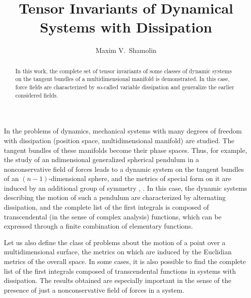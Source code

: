 \documentclass[12pt]{llncs}
\begin{document}
%

\fi
\title{Tensor Invariants of Dynamical Systems with Dissipation}
\author{Maxim V.~Shamolin 
}

\maketitle

\begin{abstract}
In this work, the complete set of tensor invariants of some classes of dynamic systems on the tangent bundles of a multidimensional
manifold is demonstrated. In this case, force fields are characterized by so-called variable dissipation
and generalize the earlier considered fields.

\end{abstract}


In the problems of dynamics, mechanical systems
with many degrees of freedom with dissipation (position
space, multidimensional manifold) are studied.
The tangent bundles of these manifolds become their
phase spaces. Thus, for example, the study of an ndimensional
generalized spherical pendulum in a nonconservative
field of forces leads to a dynamic system
on the tangent bundles of an $(n-1)$-dimensional
sphere, and the metrics of special form on it are
induced by an additional group of symmetry \cite{1}, \cite{2}. In
this case, the dynamic systems describing the motion
of such a pendulum are characterized by alternating
dissipation, and the complete list of the first integrals
is composed of transcendental (in the sense of complex
analysis) functions, which can be expressed
through a finite combination of elementary functions.

Let us also define the class of problems about the
motion of a point over a multidimensional surface, the
metrics on which are induced by the Euclidian metrics
of the overall space. In some cases, it is also possible to
find the complete list of the first integrals composed of
transcendental functions in systems with dissipation.
The results obtained are especially important in the
sense of the presence of just a nonconservative field of
forces in a system.
\end{document}
